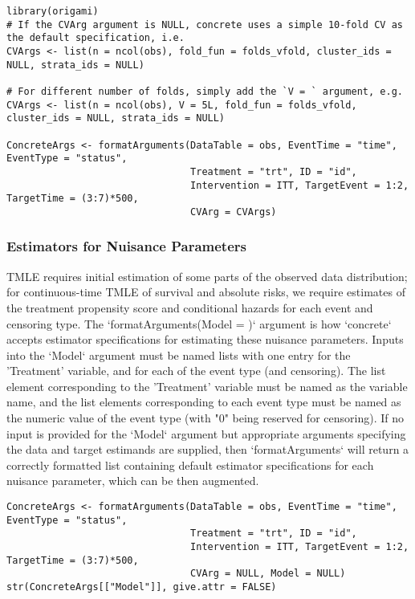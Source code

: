 \documentclass{report}
\newcommand{\1}{\ensuremath{\mathbf{1}}}
\begin{document}
\begin{lstlisting}
library(origami)
# If the CVArg argument is NULL, concrete uses a simple 10-fold CV as the default specification, i.e.
CVArgs <- list(n = ncol(obs), fold_fun = folds_vfold, cluster_ids = NULL, strata_ids = NULL)

# For different number of folds, simply add the `V = ` argument, e.g. 
CVArgs <- list(n = ncol(obs), V = 5L, fold_fun = folds_vfold, cluster_ids = NULL, strata_ids = NULL)

ConcreteArgs <- formatArguments(DataTable = obs, EventTime = "time", EventType = "status", 
                                Treatment = "trt", ID = "id", 
                                Intervention = ITT, TargetEvent = 1:2, TargetTime = (3:7)*500, 
                                CVArg = CVArgs)
\end{lstlisting}

\subsubsection{Estimators for Nuisance Parameters}
TMLE requires initial estimation of some parts of the observed data distribution; for continuous-time TMLE of survival and absolute risks, we require estimates of the treatment propensity score and conditional hazards for each event and censoring type. The `formatArguments(Model = )` argument is how `concrete` accepts estimator specifications for estimating these nuisance parameters. Inputs into the `Model` argument must be named lists with one entry for the 'Treatment' variable, and for each of the event type (and censoring). The list element corresponding to the 'Treatment' variable must be named as the variable name, and the list elements corresponding to each event type must be named as the numeric value of the event type (with "0" being reserved for censoring). If no input is provided for the `Model` argument but appropriate arguments specifying the data and target estimands are supplied, then `formatArguments` will return a correctly formatted list containing default estimator specifications for each nuisance parameter, which can be then augmented.

\begin{lstlisting}
ConcreteArgs <- formatArguments(DataTable = obs, EventTime = "time", EventType = "status", 
                                Treatment = "trt", ID = "id", 
                                Intervention = ITT, TargetEvent = 1:2, TargetTime = (3:7)*500, 
                                CVArg = NULL, Model = NULL)
str(ConcreteArgs[["Model"]], give.attr = FALSE)
\end{lstlisting}
\end{document}

